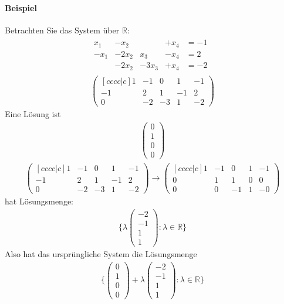 \documentclass[11pt]{report}
\newcommand*\Zb[1] {\mathbb{#1}}
\begin{document}
\paragraph{Beispiel}
Betrachten Sie das System über $\Zb{R}$:
\begin{align}
\begin{matrix}
 x_1 & -x_2 &  & +x_4 & = -1 \\
 -x_1 & -2x_2 & x_3 & - x_4 & = 2 \\
  & -2x_2 & -3x_3 & +x_4 & = -2
\end{matrix} \\
\begin{pmatrix}[cccc|c]
 1 & -1 & 0 & 1 & -1 \\
 -1 & 2 & 1 & -1 & 2 \\
 0 & -2 & -3 & 1 & -2
\end{pmatrix}
\end{align}
Eine Lösung ist
\begin{align}
\begin{pmatrix} 0 \\ 1 \\ 0 \\ 0 \end{pmatrix}
\end{align}
\begin{align}
\begin{pmatrix}[cccc|c]
 1 & -1 & 0 & 1 & -1 \\
 -1 & 2 & 1 & -1 & 2 \\
 0 & -2 & -3 & 1 & -2
\end{pmatrix}
\rightarrow
\begin{pmatrix}[cccc|c]
 1 & -1 & 0 & 1 & -1 \\
 0 & 1 & 1 & 0 & 0 \\
 0 & 0 & -1 & 1 & -0
\end{pmatrix}
\end{align}
hat Lösungsmenge:
\begin{align}
 \{\lambda \begin{pmatrix} -2 \\ -1 \\ 1 \\ 1\end{pmatrix}: \lambda \in \Zb{R}\}
\end{align}
Also hat das ursprüngliche System die Lösungsmenge
\begin{align}
 \{\begin{pmatrix} 0 \\ 1 \\ 0 \\ 0 \end{pmatrix} + \lambda \begin{pmatrix} -2 \\ -1 \\ 1 \\ 1\end{pmatrix}: \lambda \in \Zb{R}\}
\end{align}
\end{document}
